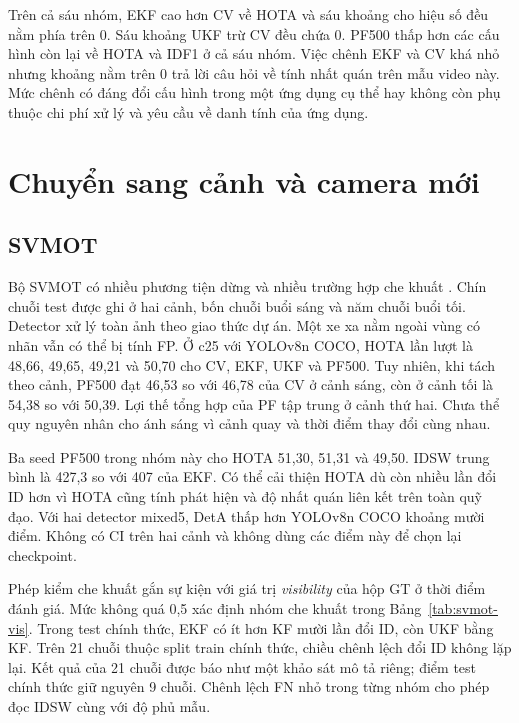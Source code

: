 Trên cả sáu nhóm, EKF cao hơn CV về HOTA và sáu khoảng cho hiệu số đều nằm phía trên 0. Sáu khoảng UKF trừ CV đều chứa 0. PF500 thấp hơn các cấu hình còn lại về HOTA và IDF1 ở cả sáu nhóm. Việc chênh EKF và CV khá nhỏ nhưng khoảng nằm trên 0 trả lời câu hỏi về tính nhất quán trên mẫu video này. Mức chênh có đáng đổi cấu hình trong một ứng dụng cụ thể hay không còn phụ thuộc chi phí xử lý và yêu cầu về danh tính của ứng dụng.

\section{Chuyển sang cảnh và camera mới}
\subsection{SVMOT}
Bộ SVMOT có nhiều phương tiện dừng và nhiều trường hợp che khuất \cite{svmot}. Chín chuỗi test được ghi ở hai cảnh, bốn chuỗi buổi sáng và năm chuỗi buổi tối. Detector xử lý toàn ảnh theo giao thức dự án. Một xe xa nằm ngoài vùng có nhãn vẫn có thể bị tính FP. Ở c25 với YOLOv8n COCO, HOTA lần lượt là 48,66, 49,65, 49,21 và 50,70 cho CV, EKF, UKF và PF500. Tuy nhiên, khi tách theo cảnh, PF500 đạt 46,53 so với 46,78 của CV ở cảnh sáng, còn ở cảnh tối là 54,38 so với 50,39. Lợi thế tổng hợp của PF tập trung ở cảnh thứ hai. Chưa thể quy nguyên nhân cho ánh sáng vì cảnh quay và thời điểm thay đổi cùng nhau.

Ba seed PF500 trong nhóm này cho HOTA 51,30, 51,31 và 49,50. IDSW trung bình là 427,3 so với 407 của EKF. Có thể cải thiện HOTA dù còn nhiều lần đổi ID hơn vì HOTA cũng tính phát hiện và độ nhất quán liên kết trên toàn quỹ đạo. Với hai detector mixed5, DetA thấp hơn YOLOv8n COCO khoảng mười điểm. Không có CI trên hai cảnh và không dùng các điểm này để chọn lại checkpoint.

Phép kiểm che khuất gắn sự kiện với giá trị \emph{visibility} của hộp GT ở thời điểm đánh giá. Mức không quá 0,5 xác định nhóm che khuất trong Bảng~\ref{tab:svmot-vis}. Trong test chính thức, EKF có ít hơn KF mười lần đổi ID, còn UKF bằng KF. Trên 21 chuỗi thuộc split train chính thức, chiều chênh lệch đổi ID không lặp lại. Kết quả của 21 chuỗi được báo như một khảo sát mô tả riêng; điểm test chính thức giữ nguyên 9 chuỗi. Chênh lệch FN nhỏ trong từng nhóm cho phép đọc IDSW cùng với độ phủ mẫu.

